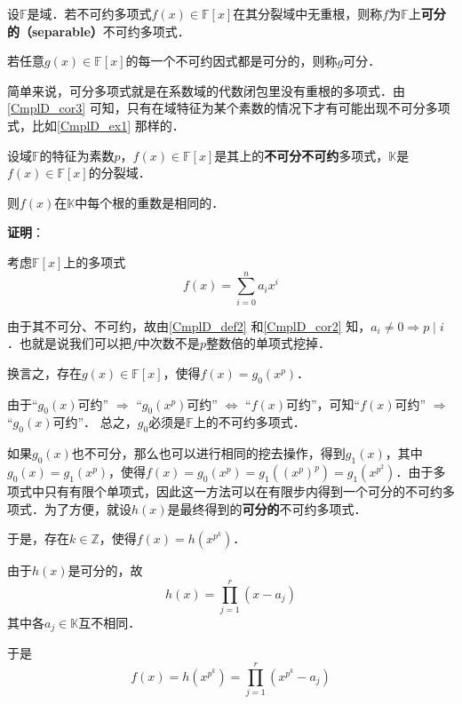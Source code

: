 \begin{definition}{}\label{CmplD_def2}

设$\mathbb{F}$是域．若不可约多项式$f(x)\in\mathbb{F}[x]$在其分裂域中无重根，则称$f$为$\mathbb{F}$上\textbf{可分的（separable）}不可约多项式．

若任意$g(x)\in\mathbb{F}[x]$的每一个不可约因式都是可分的，则称$g$可分．

\end{definition}

简单来说，可分多项式就是在系数域的代数闭包里没有重根的多项式．由\autoref{CmplD_cor3} 可知，只有在域特征为某个素数的情况下才有可能出现不可分多项式，比如\autoref{CmplD_ex1} 那样的．


\begin{theorem}{}\label{CmplD_the3}
设域$\mathbb{F}$的特征为素数$p$，$f(x)\in\mathbb{F}[x]$是其上的\textbf{不可分不可约}多项式，$\mathbb{K}$是$f(x)\in\mathbb{F}[x]$的分裂域．

则$f(x)$在$\mathbb{K}$中每个根的重数是相同的．
\end{theorem}

\textbf{证明}：

考虑$\mathbb{F}[x]$上的多项式
\begin{equation}
f(x) = \sum_{i=0}^n a_ix^i
\end{equation}


由于其不可分、不可约，故由\autoref{CmplD_def2} 和\autoref{CmplD_cor2} 知，$a_i\neq 0 \Rightarrow p\mid i$．也就是说我们可以把$f$中次数不是$p$整数倍的单项式挖掉．

换言之，存在$g(x)\in\mathbb{F}[x]$，使得$f(x)=g_0(x^p)$．

由于“$g_0(x)$可约” $\Rightarrow$ “$g_0(x^p)$可约” $\iff$ “$f(x)$可约”，可知“$f(x)$可约” $\Rightarrow$ “$g_0(x)$可约”． 总之，$g_0$必须是$\mathbb{F}$上的不可约多项式．

如果$g_0(x)$也不可分，那么也可以进行相同的挖去操作，得到$g_1(x)$，其中$g_0(x) = g_1(x^p)$，使得$f(x) = g_0(x^p) = g_1((x^p)^p) = g_1(x^{p^2})$．由于多项式中只有有限个单项式，因此这一方法可以在有限步内得到一个可分的不可约多项式．为了方便，就设$h(x)$是最终得到的\textbf{可分的}不可约多项式．

于是，存在$k\in\mathbb{Z}$，使得$f(x) = h(x^{p^k})$．

由于$h(x)$是可分的，故
\begin{equation}
h(x) = \prod_{j=1}^{r}(x-a_j)
\end{equation}
其中各$a_j\in\mathbb{K}$互不相同．

于是
\begin{equation}
f(x) = h(x^{p^k}) = \prod_{j=1}^{r}(x^{p^k}-a_j)
\end{equation}

